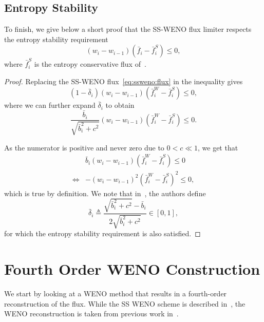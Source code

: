 \documentclass{scrartcl}
\begin{document}
\subsection{Entropy Stability}
\label{ssc:ssweno:stability}

To finish, we give below a short proof that the SS-WENO flux limiter respects
the entropy stability requirement~\cite[Equation 3.41]{Fisher2013}
\[
(w_i - w_{i - 1}) (\bar{f}_i - \bar{f}_i^{S}) \le 0,
\]
where $\bar{f}_i^{S}$ is the entropy conservative flux of~.

\begin{proof}
Replacing the SS-WENO flux~\eqref{eq:ssweno:flux} in the inequality gives
\[
(1 - \bar{\delta}_i) (w_i - w_{i - 1}) (\bar{f}_i^W - \bar{f}_i^{S}) \le 0,
\]
where we can further expand $\bar{\delta}_i$ to obtain
\[
\frac{\bar{b}_i}{\sqrt{\bar{b}_i^2 + c^2}}
    (w_i - w_{i - 1}) (\bar{f}_i^W - \bar{f}_i^{S}) \le 0.
\]

As the numerator is positive and never zero due to $0 < c \ll 1$, we get that
\[
\begin{aligned}
&
\bar{b}_i (w_i - w_{i - 1}) (\bar{f}_i^W - \bar{f}_i^{S}) \le 0 \\
\Leftrightarrow &
-(w_i - w_{i - 1})^2 (\bar{f}_i^W - \bar{f}_i^{S})^2 \le 0,
\end{aligned}
\]
which is true by definition. We note that in~\cite{Fisher2012}, the authors
define
\[
\bar{\delta}_i \triangleq
    \frac{\sqrt{\bar{b}_i^2 + c^2} - \bar{b}_i}{2 \sqrt{\bar{b}_i^2 + c^2}}
    \in [0, 1],
\]
for which the entropy stability requirement is also satisfied.
\end{proof}


\section{Fourth Order WENO Construction} %
\label{sc:weno}

We start by looking at a WENO method that results in a fourth-order reconstruction
of the flux. While the SS WENO scheme is described in~\cite{Fisher2013}, the
WENO reconstruction is taken from previous work in~\cite{Fisher2011}.
\end{document}
